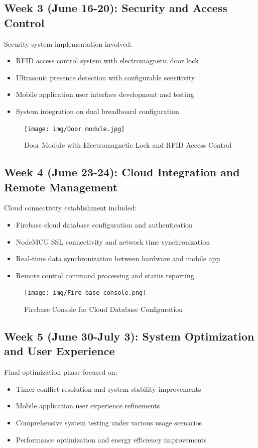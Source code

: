 \documentclass[12pt,a4paper]{report}
\begin{document}
\subsection{Week 3 (June 16-20): Security and Access Control}
\noindent Security system implementation involved:
\begin{itemize}
\item RFID access control system with electromagnetic door lock
\item Ultrasonic presence detection with configurable sensitivity
\item Mobile application user interface development and testing
\item System integration on dual breadboard configuration
\end{itemize}

\begin{figure}[H]
    \centering
    \texttt{[image: img/Door module.jpg]}
    \caption{Door Module with Electromagnetic Lock and RFID Access Control}
    \label{fig:door-module}
\end{figure}

\subsection{Week 4 (June 23-24): Cloud Integration and Remote Management}
\noindent Cloud connectivity establishment included:
\begin{itemize}
\item Firebase cloud database configuration and authentication
\item NodeMCU SSL connectivity and network time synchronization
\item Real-time data synchronization between hardware and mobile app
\item Remote control command processing and status reporting
\end{itemize}

\begin{figure}[H]
    \centering
    \texttt{[image: img/Fire-base console.png]}
    \caption{Firebase Console for Cloud Database Configuration}
    \label{fig:firebase-console}
\end{figure}

\subsection{Week 5 (June 30-July 3): System Optimization and User Experience}
\noindent Final optimization phase focused on:
\begin{itemize}
\item Timer conflict resolution and system stability improvements
\item Mobile application user experience refinements
\item Comprehensive system testing under various usage scenarios
\item Performance optimization and energy efficiency improvements
\end{itemize}
\end{document}
